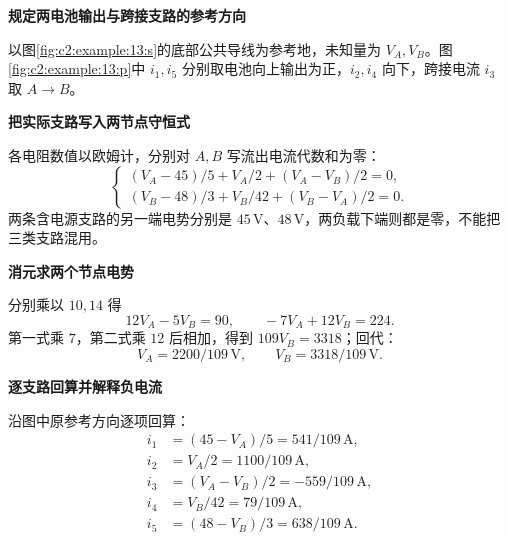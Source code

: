 \begin{solution}\textbf{规定两电池输出与跨接支路的参考方向}\par\nobreak
以图\ref{fig:c2:example:13:s}的底部公共导线为参考地，未知量为 $V_A,V_B$。图\ref{fig:c2:example:13:p}中 $i_1,i_5$ 分别取电池向上输出为正，$i_2,i_4$ 向下，跨接电流 $i_3$ 取 $A\to B$。


\par\medskip{}\noindent\textbf{把实际支路写入两节点守恒式}\par\nobreak
各电阻数值以欧姆计，分别对 $A,B$ 写流出电流代数和为零：
\[
 \begin{cases}
 (V_A-45)/5+V_A/2+(V_A-V_B)/2=0,\\
 (V_B-48)/3+V_B/42+(V_B-V_A)/2=0.
 \end{cases}
\]
两条含电源支路的另一端电势分别是 $45\,\mathrm V$、$48\,\mathrm V$，两负载下端则都是零，不能把三类支路混用。



\par\medskip{}\noindent\textbf{消元求两个节点电势}\par\nobreak
分别乘以 $10,14$ 得
\[
 12V_A-5V_B=90,\qquad -7V_A+12V_B=224.
\]
第一式乘 $7$，第二式乘 $12$ 后相加，得到 $109V_B=3318$；回代：
\[
 \boxed{V_A=2200/109\,\mathrm V},\qquad
 \boxed{V_B=3318/109\,\mathrm V}.
\]


\par\medskip{}\noindent\textbf{逐支路回算并解释负电流}\par\nobreak
沿图中原参考方向逐项回算：
\begin{align*}
 i_1&=(45-V_A)/5=541/109\,\mathrm A,\\
 i_2&=V_A/2=1100/109\,\mathrm A,\\
 i_3&=(V_A-V_B)/2=-559/109\,\mathrm A,\\
 i_4&=V_B/42=79/109\,\mathrm A,\\
 i_5&=(48-V_B)/3=638/109\,\mathrm A.
\end{align*}



\end{solution}
